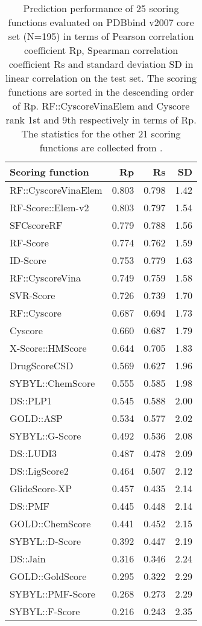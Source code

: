 \documentclass[twocolumn]{bmcart}
\begin{document}
\begin{backmatter}
\begin{table}[ht]
\caption{Prediction performance of 25 scoring functions evaluated on PDBbind v2007 core set (N=195) in terms of Pearson correlation coefficient Rp, Spearman correlation coefficient Rs and standard deviation SD in linear correlation on the test set. The scoring functions are sorted in the descending order of Rp. RF::CyscoreVinaElem and Cyscore rank 1st and 9th respectively in terms of Rp. The statistics for the other 21 scoring functions are collected from \cite{1362,1370,1347}.}
\label{tbl:trn1105tst195}
\begin{tabular}{lrrr}
\hline
Scoring function & Rp & Rs & SD\\
\hline
RF::CyscoreVinaElem & 0.803 & 0.798 & 1.42\\
RF-Score::Elem-v2 & 0.803 & 0.797 & 1.54 \\
SFCscoreRF & 0.779 & 0.788 & 1.56\\
RF-Score & 0.774 & 0.762 & 1.59\\
ID-Score & 0.753 & 0.779 & 1.63\\
RF::CyscoreVina & 0.749 & 0.759 & 1.58\\
SVR-Score & 0.726 & 0.739 & 1.70\\
RF::Cyscore & 0.687 & 0.694 & 1.73\\
Cyscore & 0.660 & 0.687 & 1.79\\
X-Score::HMScore & 0.644 & 0.705 & 1.83\\
DrugScoreCSD & 0.569 & 0.627 & 1.96\\
SYBYL::ChemScore & 0.555 & 0.585 & 1.98\\
DS::PLP1 & 0.545 & 0.588 & 2.00\\
GOLD::ASP & 0.534 & 0.577 & 2.02\\
SYBYL::G-Score & 0.492 & 0.536 & 2.08\\
DS::LUDI3 & 0.487 & 0.478 & 2.09\\
DS::LigScore2 & 0.464 & 0.507 & 2.12\\
GlideScore-XP & 0.457 & 0.435 & 2.14\\
DS::PMF & 0.445 & 0.448 & 2.14\\
GOLD::ChemScore & 0.441 & 0.452 & 2.15\\
SYBYL::D-Score & 0.392 & 0.447 & 2.19\\
DS::Jain & 0.316 & 0.346 & 2.24\\
GOLD::GoldScore & 0.295 & 0.322 & 2.29\\
SYBYL::PMF-Score & 0.268 & 0.273 & 2.29\\
SYBYL::F-Score & 0.216 & 0.243 & 2.35\\
\hline
\end{tabular}
\end{table}


\end{backmatter}
\end{document}

